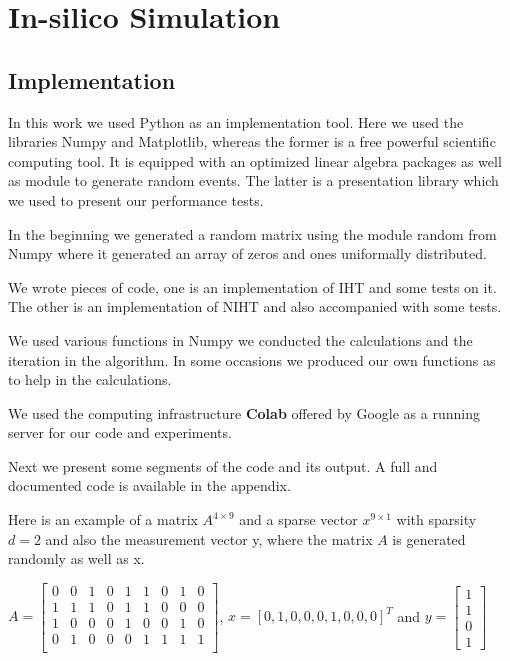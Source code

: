 \chapter{In-silico Simulation}

\section{Implementation} 

In this work we used Python as an implementation tool. Here we used the libraries Numpy and Matplotlib, whereas the former is a free powerful scientific computing tool. It is equipped with an optimized linear algebra packages as well as module to generate random events. The latter is a presentation library which we used to present our performance tests. 

In the beginning we generated a random matrix using the module random from Numpy where it generated an array of zeros and ones uniformally distributed. 

We wrote pieces of code, one is an implementation of IHT and some tests on it. The other is an implementation of NIHT and also accompanied with some tests. 


We used various functions in Numpy we conducted the calculations and the iteration in the algorithm. In some occasions we produced our own functions as to help in the calculations.   


We used the computing infrastructure \textbf{Colab} offered by Google as a running server for our code and experiments. 

Next we present some segments of the code and its output. A full and documented code is available in the appendix.   

Here is an example of a matrix $A^{4\times 9}$ and a sparse vector $x^{9\times1}$ with sparsity $d = 2$ and also the measurement vector y, where the matrix $ A $ is generated randomly as well as x.  




$ A =  \begin{bmatrix}
0 & 0 & 1 & 0 & 1 & 1 & 0 & 1 &0 \\
1 & 1 & 1 & 0 & 1 & 1 & 0 & 0 &0 \\
1 & 0 & 0 & 0 & 1 & 0 & 0 & 1 &0 \\
0 & 1 & 0 & 0 & 0 & 1 & 1 & 1 &1 \\
\end{bmatrix}$,  \quad  $ x = [0, 1, 0, 0, 0, 1, 0, 0, 0]^{T} $  and $y = \begin{bmatrix}
1\\
1\\
0\\
1
\end{bmatrix}$

